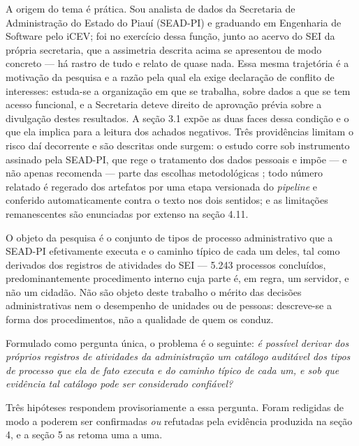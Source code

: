A origem do tema é prática. Sou analista de dados da Secretaria de Administração do Estado
do Piauí (SEAD-PI) e graduando em Engenharia de Software pelo iCEV; foi no exercício dessa função,
junto ao acervo do SEI da própria secretaria, que a assimetria descrita acima se apresentou de
modo concreto --- há rastro de tudo e relato de quase nada. Essa mesma trajetória é a motivação da
pesquisa e a razão pela qual ela exige declaração de conflito de interesses: estuda-se a
organização em que se trabalha, sobre dados a que se tem acesso funcional, e a Secretaria deteve
direito de aprovação prévia sobre a divulgação destes resultados. A seção 3.1 expõe as duas faces
dessa condição e o que ela implica para a leitura dos achados negativos. Três providências
limitam o risco daí decorrente e são descritas onde surgem: o estudo
corre sob instrumento assinado pela SEAD-PI, que rege o tratamento dos dados pessoais e impõe ---
e não apenas recomenda --- parte das escolhas metodológicas \cite{seadpi2026termo}; todo número
relatado é regerado dos artefatos por uma etapa versionada do \emph{pipeline} e conferido
automaticamente contra o texto nos dois sentidos; e as limitações remanescentes são enunciadas
por extenso na seção 4.11.

O objeto da pesquisa é o conjunto de tipos de processo administrativo que a SEAD-PI efetivamente
executa e o caminho típico de cada um deles, tal como derivados dos registros de atividades do SEI ---
5.243 processos concluídos, predominantemente procedimento interno cuja parte é, em regra, um
servidor, e não um cidadão. Não são objeto deste trabalho o mérito das decisões administrativas
nem o desempenho de unidades ou de pessoas: descreve-se a forma dos procedimentos, não a
qualidade de quem os conduz.

Formulado como pergunta única, o problema é o seguinte: \emph{é possível derivar dos próprios registros de atividades da administração um catálogo auditável dos tipos de processo que ela de fato executa e
do caminho típico de cada um, e sob que evidência tal catálogo pode ser considerado confiável?}

Três hipóteses respondem provisoriamente a essa pergunta. Foram redigidas de modo a poderem ser
confirmadas \emph{ou} refutadas pela evidência produzida na seção 4, e a seção 5 as retoma uma a
uma.

